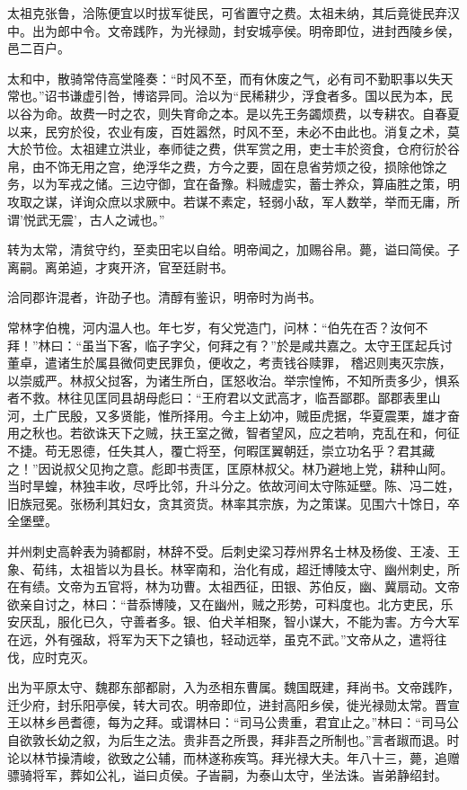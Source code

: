 \documentclass[12pt,UTF8]{ctexbook}
\begin{document}
太祖克张鲁，洽陈便宜以时拔军徙民，可省置守之费。太祖未纳，其后竟徙民弃汉中。出为郎中令。文帝践阼，为光禄勋，封安城亭侯。明帝即位，进封西陵乡侯，邑二百户。

太和中，散骑常侍高堂隆奏：“时风不至，而有休废之气，必有司不勤职事以失天常也。”诏书谦虚引咎，博谘异同。洽以为“民稀耕少，浮食者多。国以民为本，民以谷为命。故费一时之农，则失育命之本。是以先王务蠲烦费，以专耕农。自春夏以来，民穷於役，农业有废，百姓嚣然，时风不至，未必不由此也。消复之术，莫大於节俭。太祖建立洪业，奉师徒之费，供军赏之用，吏士丰於资食，仓府衍於谷帛，由不饰无用之宫，绝浮华之费，方今之要，固在息省劳烦之役，损除他馀之务，以为军戎之储。三边守御，宜在备豫。料贼虚实，蓄士养众，算庙胜之策，明攻取之谋，详询众庶以求厥中。若谋不素定，轻弱小敌，军人数举，举而无庸，所谓'悦武无震'，古人之诫也。”

转为太常，清贫守约，至卖田宅以自给。明帝闻之，加赐谷帛。薨，谥曰简侯。子离嗣。离弟逌，才爽开济，官至廷尉书。

洽同郡许混者，许劭子也。清醇有鉴识，明帝时为尚书。

常林字伯槐，河内温人也。年七岁，有父党造门，问林：“伯先在否？汝何不拜！”林曰：“虽当下客，临子字父，何拜之有？”於是咸共嘉之。太守王匡起兵讨董卓，遣诸生於属县微伺吏民罪负，便收之，考责钱谷赎罪， 稽迟则夷灭宗族，以崇威严。林叔父挝客，为诸生所白，匡怒收治。举宗惶怖，不知所责多少，惧系者不救。林往见匡同县胡母彪曰：“王府君以文武高才，临吾鄙郡。鄙郡表里山河，土广民殷，又多贤能，惟所择用。今主上幼冲，贼臣虎据，华夏震栗，雄才奋用之秋也。若欲诛天下之贼，扶王室之微，智者望风，应之若响，克乱在和，何征不捷。苟无恩德，任失其人，覆亡将至，何暇匡翼朝廷，崇立功名乎？君其藏之！”因说叔父见拘之意。彪即书责匡，匡原林叔父。林乃避地上党，耕种山阿。当时旱蝗，林独丰收，尽呼比邻，升斗分之。依故河间太守陈延壁。陈、冯二姓，旧族冠冕。张杨利其妇女，贪其资货。林率其宗族，为之策谋。见围六十馀日，卒全堡壁。

并州刺史高幹表为骑都尉，林辞不受。后刺史梁习荐州界名士林及杨俊、王凌、王象、荀纬，太祖皆以为县长。林宰南和，治化有成，超迁博陵太守、幽州刺史，所在有绩。文帝为五官将，林为功曹。太祖西征，田银、苏伯反，幽、冀扇动。文帝欲亲自讨之，林曰：“昔忝博陵，又在幽州，贼之形势，可料度也。北方吏民，乐安厌乱，服化已久，守善者多。银、伯犬羊相聚，智小谋大，不能为害。方今大军在远，外有强敌，将军为天下之镇也，轻动远举，虽克不武。”文帝从之，遣将往伐，应时克灭。

出为平原太守、魏郡东部都尉，入为丞相东曹属。魏国既建，拜尚书。文帝践阼，迁少府，封乐阳亭侯，转大司农。明帝即位，进封高阳乡侯，徙光禄勋太常。晋宣王以林乡邑耆德，每为之拜。或谓林曰：“司马公贵重，君宜止之。”林曰：“司马公自欲敦长幼之叙，为后生之法。贵非吾之所畏，拜非吾之所制也。”言者踧而退。时论以林节操清峻，欲致之公辅，而林遂称疾笃。拜光禄大夫。年八十三，薨，追赠骠骑将军，葬如公礼，谥曰贞侯。子峕嗣，为泰山太守，坐法诛。峕弟静绍封。
\end{document}
